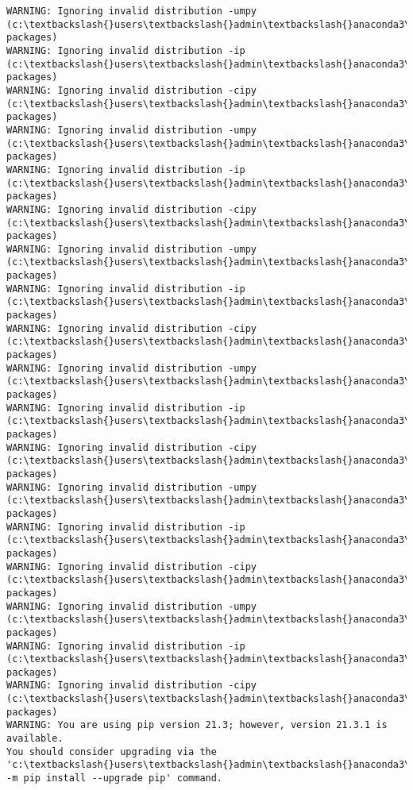 \documentclass[11pt]{article}
\begin{document}
    \begin{Verbatim}[commandchars=\\\{\}]
WARNING: Ignoring invalid distribution -umpy (c:\textbackslash{}users\textbackslash{}admin\textbackslash{}anaconda3\textbackslash{}lib\textbackslash{}site-packages)
WARNING: Ignoring invalid distribution -ip (c:\textbackslash{}users\textbackslash{}admin\textbackslash{}anaconda3\textbackslash{}lib\textbackslash{}site-packages)
WARNING: Ignoring invalid distribution -cipy (c:\textbackslash{}users\textbackslash{}admin\textbackslash{}anaconda3\textbackslash{}lib\textbackslash{}site-packages)
WARNING: Ignoring invalid distribution -umpy (c:\textbackslash{}users\textbackslash{}admin\textbackslash{}anaconda3\textbackslash{}lib\textbackslash{}site-packages)
WARNING: Ignoring invalid distribution -ip (c:\textbackslash{}users\textbackslash{}admin\textbackslash{}anaconda3\textbackslash{}lib\textbackslash{}site-packages)
WARNING: Ignoring invalid distribution -cipy (c:\textbackslash{}users\textbackslash{}admin\textbackslash{}anaconda3\textbackslash{}lib\textbackslash{}site-packages)
WARNING: Ignoring invalid distribution -umpy (c:\textbackslash{}users\textbackslash{}admin\textbackslash{}anaconda3\textbackslash{}lib\textbackslash{}site-packages)
WARNING: Ignoring invalid distribution -ip (c:\textbackslash{}users\textbackslash{}admin\textbackslash{}anaconda3\textbackslash{}lib\textbackslash{}site-packages)
WARNING: Ignoring invalid distribution -cipy (c:\textbackslash{}users\textbackslash{}admin\textbackslash{}anaconda3\textbackslash{}lib\textbackslash{}site-packages)
WARNING: Ignoring invalid distribution -umpy (c:\textbackslash{}users\textbackslash{}admin\textbackslash{}anaconda3\textbackslash{}lib\textbackslash{}site-packages)
WARNING: Ignoring invalid distribution -ip (c:\textbackslash{}users\textbackslash{}admin\textbackslash{}anaconda3\textbackslash{}lib\textbackslash{}site-packages)
WARNING: Ignoring invalid distribution -cipy (c:\textbackslash{}users\textbackslash{}admin\textbackslash{}anaconda3\textbackslash{}lib\textbackslash{}site-packages)
WARNING: Ignoring invalid distribution -umpy (c:\textbackslash{}users\textbackslash{}admin\textbackslash{}anaconda3\textbackslash{}lib\textbackslash{}site-packages)
WARNING: Ignoring invalid distribution -ip (c:\textbackslash{}users\textbackslash{}admin\textbackslash{}anaconda3\textbackslash{}lib\textbackslash{}site-packages)
WARNING: Ignoring invalid distribution -cipy (c:\textbackslash{}users\textbackslash{}admin\textbackslash{}anaconda3\textbackslash{}lib\textbackslash{}site-packages)
WARNING: Ignoring invalid distribution -umpy (c:\textbackslash{}users\textbackslash{}admin\textbackslash{}anaconda3\textbackslash{}lib\textbackslash{}site-packages)
WARNING: Ignoring invalid distribution -ip (c:\textbackslash{}users\textbackslash{}admin\textbackslash{}anaconda3\textbackslash{}lib\textbackslash{}site-packages)
WARNING: Ignoring invalid distribution -cipy (c:\textbackslash{}users\textbackslash{}admin\textbackslash{}anaconda3\textbackslash{}lib\textbackslash{}site-packages)
WARNING: You are using pip version 21.3; however, version 21.3.1 is available.
You should consider upgrading via the 'c:\textbackslash{}users\textbackslash{}admin\textbackslash{}anaconda3\textbackslash{}python.exe -m pip install --upgrade pip' command.


\end{Verbatim}
\end{document}
